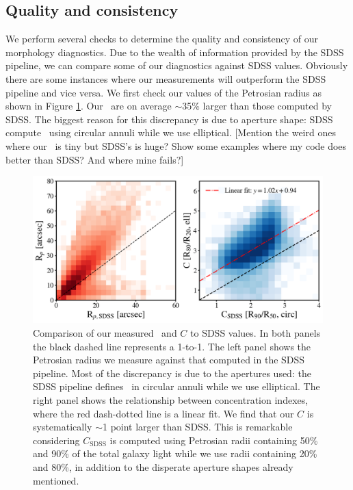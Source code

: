 \subsection{Quality and consistency}
We perform several checks to determine the quality and consistency of our morphology diagnostics. Due to the wealth of information provided by the SDSS pipeline, we can compare some of our diagnostics against SDSS values. Obviously there are some instances where our measurements will outperform the SDSS pipeline and vice versa. We first check our values of the Petrosian radius as shown in Figure \ref{fig: Rp and C comparison}. Our \rp~are on average $\sim$35\% larger than those computed by SDSS. The biggest reason for this discrepancy is due to aperture shape: SDSS compute \rp~using circular annuli while we use elliptical. [Mention the weird ones where our \rp~is tiny but SDSS's is huge? Show some examples where my code does better than SDSS? And where mine fails?]

\begin{figure}
\centering
\includegraphics[width=\textwidth]{Figures/compare_Rp_concentrations.png}
\caption[Comparison of Petrosian radius and concentration index from this work to SDSS values]{Comparison of our measured \rp~and $C$ to SDSS values. In both panels the black dashed line represents a 1-to-1. The left panel shows the Petrosian radius we measure against that computed in the SDSS pipeline. Most of the discrepancy is due to the apertures used: the SDSS pipeline defines \rp~in circular annuli while we use elliptical. 
The right panel shows the relationship between concentration indexes, where the red dash-dotted line is a linear fit. We find that our $C$ is systematically $\sim$1 point larger than SDSS. This is remarkable considering $C_{\mathrm{SDSS}}$ is computed using Petrosian radii containing 50\% and 90\% of the total galaxy light while we use radii containing 20\% and 80\%, in addition to the disperate aperture shapes already mentioned.}
\label{fig: Rp and C comparison}
\end{figure}

